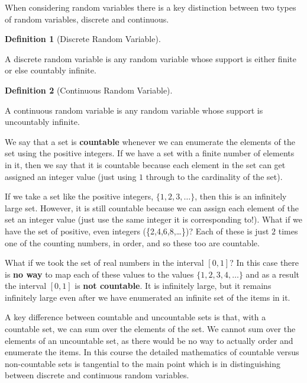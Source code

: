 \documentclass[
  letterpaper,
  DIV=11,
  numbers=noendperiod]{scrreprt}
\theoremstyle{definition}
\newtheorem{definition}{Definition}[chapter]
\theoremstyle{definition}
\theoremstyle{definition}
\theoremstyle{remark}
\begin{document}
When considering random variables there is a key distinction between two
types of random variables, discrete and continuous.

\begin{definition}[Discrete Random
Variable]\protect\hypertarget{def-discrete-random-variable}{}\label{def-discrete-random-variable}

A discrete random variable is any random variable whose support is
either finite or else countably infinite.

\end{definition}

\begin{definition}[Continuous Random
Variable]\protect\hypertarget{def-continuous-random-variable}{}\label{def-continuous-random-variable}

A continuous random variable is any random variable whose support is
uncountably infinite.

\end{definition}

\begin{tcolorbox}[enhanced jigsaw, rightrule=.15mm, leftrule=.75mm, opacitybacktitle=0.6, title={Countable and Uncountable Sets}, colframe=quarto-callout-note-color-frame, opacityback=0, coltitle=black, breakable, toptitle=1mm, colbacktitle=quarto-callout-note-color!10!white, bottomtitle=1mm, titlerule=0mm, arc=.35mm, colback=white, toprule=.15mm, left=2mm, bottomrule=.15mm]

We say that a set is \textbf{countable} whenever we can enumerate the
elements of the set using the positive integers. If we have a set with a
finite number of elements in it, then we say that it is countable
because each element in the set can get assigned an integer value (just
using \(1\) through to the cardinality of the set).

If we take a set like the positive integers, \(\{1,2,3,\dots\}\), then
this is an infinitely large set. However, it is still countable because
we can assign each element of the set an integer value (just use the
same integer it is corresponding to!). What if we have the set of
positive, even integers (\{2,4,6,8,\dots\})? Each of these is just \(2\)
times one of the counting numbers, in order, and so these too are
countable.

What if we took the set of real numbers\footnotemark{} in the interval
\([0,1]\)? In this case there is \textbf{no way} to map each of these
values to the values \(\{1,2,3,4,\dots\}\) and as a result the interval
\([0,1]\) is \textbf{not countable}. It is infinitely large, but it
remains infinitely large even after we have enumerated an infinite set
of the items in it.

A key difference between countable and uncountable sets is that, with a
countable set, we can\footnotemark{} sum over the elements of the set.
We cannot sum over the elements of an uncountable set, as there would be
no way to actually order and enumerate the items. In this course the
detailed mathematics of countable versus non-countable sets is
tangential to the main point which is in distinguishing between discrete
and continuous random variables.

\end{tcolorbox}
\end{document}
